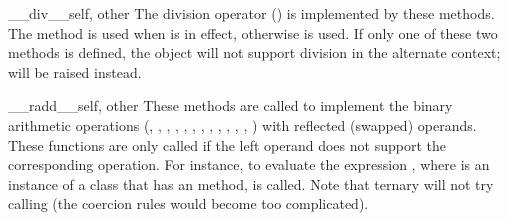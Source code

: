 \begin{methoddesc}{__div__}{self, other}
The division operator (\code{/}) is implemented by these methods.  The
 method is used when 
is in effect, otherwise  is used.  If only one of
these two methods is defined, the object will not support division in
the alternate context;  will be raised instead.
\end{methoddesc}

\begin{methoddesc}{__radd__}{self, other}
These methods are
called to implement the binary arithmetic operations (\code{+},
\code{-}, \code{*}, \code{/}, \code{\%},
,
, \code{**}, \code{<}\code{<},
\code{>}\code{>}, \code{\&}, \code{\^}, \code{|}) with reflected
(swapped) operands.  These functions are only called if the left
operand does not support the corresponding operation.  For instance,
to evaluate the expression \code{-}, where  is an
instance of a class that has an  method,
 is called.  Note that ternary
 will not try calling
 (the coercion rules would become too
complicated).
\end{methoddesc}

